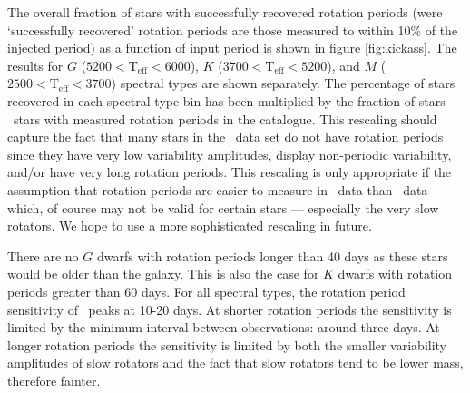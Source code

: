The overall fraction of stars with successfully recovered rotation periods
(were `successfully recovered' rotation periods are those measured to within
10\% of the injected period) as a function of input period is shown in figure
\ref{fig:kickass}.
The results for $G$ ($5200<\mathrm{T}_{\mathrm{eff}}<6000$), $K$
($3700<\mathrm{T}_{\mathrm{eff}}<5200$), and $M$
($2500<\mathrm{T}_{\mathrm{eff}}<3700$) spectral types are shown separately.
The percentage of stars recovered in each spectral type bin has been
multiplied by the fraction of stars \kepler\ stars with measured rotation
periods in the \citet{Mcquillan2014} catalogue.
This rescaling should capture the fact that many stars in the \kepler\ data
set do not have rotation periods since they have very low variability
amplitudes, display non-periodic variability, and/or have very long rotation
periods.
This rescaling is only appropriate if the assumption that rotation periods are
easier to measure in \kepler\ data than \LSST\ data which, of course may not
be valid for certain stars --- especially the very slow rotators.
We hope to use a more sophisticated rescaling in future.

There are no $G$ dwarfs with rotation periods longer than 40 days as these
stars would be older than the galaxy.
This is also the case for $K$ dwarfs with rotation periods greater than 60
days.
For all spectral types, the rotation period sensitivity of \LSST\ peaks at
10-20 days.
At shorter rotation periods the sensitivity is limited by the minimum interval
between observations: around three days.
At longer rotation periods the sensitivity is limited by both the smaller
variability amplitudes of slow rotators and the fact that slow rotators tend
to be lower mass, therefore fainter.

